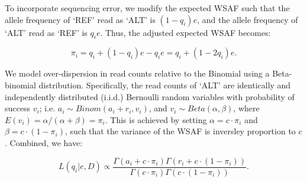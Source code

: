 \documentclass[9pt,lineno]{elife}
\begin{document}

To incorporate sequencing error, we modify the expected WSAF such that the allele frequency of `REF' read as `ALT' is $(1 - q_i)e$, and the allele frequency of `ALT' read as `REF' is $q_ie$. Thus, the adjusted expected WSAF becomes:

\begin{equation}
\pi_i = q_i + (1 - q_i)e - q_ie = q_i + (1 - 2q_i)e.\label{eqn:adj_q}
\end{equation}

\noindent We model over-dispersion in read counts relative to the Binomial using a Beta-binomial distribution. Specifically, the read counts of `ALT' are identically and independently distributed (i.i.d.) Bernoulli random variables with probability of success $v_i$; i.e. $a_i \sim Binom(a_i + r_i, v_i)$, and $v_i \sim Beta(\alpha, \beta)$, where $E(v_i) = \alpha/(\alpha+\beta) = \pi_{i}$. This is achieved by setting $\alpha = c\cdot \pi_{i} $ and $\beta = c\cdot (1-\pi_{i})$, such that the variance of the WSAF is inversley proportion to $c$.  Combined, we have:

\begin{equation}
L(q_{i}| e, D) \propto \frac{\Gamma(a_i + c\cdot \pi_{i}) \Gamma(r_i + c\cdot (1-\pi_{i}))}{\Gamma(c\cdot \pi_{i})\Gamma(c\cdot (1-\pi_{i}))}. \label{eqn:llk}
\end{equation}




\end{document}
